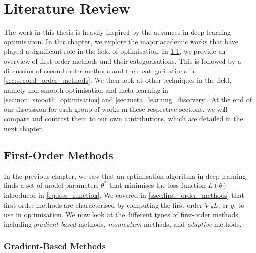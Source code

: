 \chapter{Literature Review}
\label{chap:lit_review}


The work in this thesis is heavily inspired by the advances in deep learning optimisation. In this chapter, we explore the major academic works that have played a significant role in the field of optimisation. In \cref{sec:first_order_methods}, we provide an overview of
first-order methods and their categorisations. This is followed by a discussion of second-order methods and their categorisations in \cref{sec:second_order_methods}. We then look at other techniques in the field, namely non-smooth optimisation and meta-learning in \cref{sec:non_smooth_optimisation} and \cref{sec:meta_learning_discovery}. At the end of our discussion for each group of works in these respective sections, we will compare and contrast them to our own contributions, which are detailed in the next chapter.

\section{First-Order Methods}
\label{sec:first_order_methods}

In the previous chapter, we saw that an optimisation algorithm in deep learning finds a set of model parameters $\theta^*$ that minimises the loss function $L(\theta)$ introduced in \cref{eq:loss_function}. We covered in \cref{ssec:first_order_methods} that first-order methods are characterised by computing the first order $\nabla_{\theta}L$, or $g$, to use in optimisation. We now look at the different types of first-order methods, including \textit{gradient-based} methods, \textit{momentum} methods, and \textit{adaptive} methods.

\subsection{Gradient-Based Methods}
\label{ssec:gradient_based_methods}

